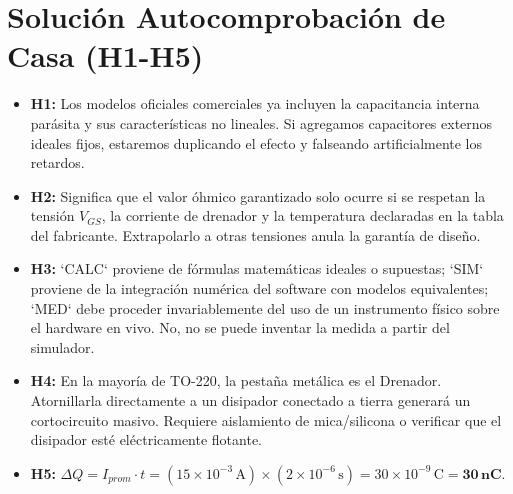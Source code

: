 \documentclass[11pt, a4paper]{article}
\begin{document}
\section*{Solución Autocomprobación de Casa (H1-H5)}
\begin{itemize}
    \setlength\itemsep{0.2em}
    \item \textbf{H1:} Los modelos oficiales comerciales ya incluyen la capacitancia interna parásita y sus características no lineales. Si agregamos capacitores externos ideales fijos, estaremos duplicando el efecto y falseando artificialmente los retardos.
    \item \textbf{H2:} Significa que el valor óhmico garantizado solo ocurre si se respetan la tensión $V_{GS}$, la corriente de drenador y la temperatura declaradas en la tabla del fabricante. Extrapolarlo a otras tensiones anula la garantía de diseño.
    \item \textbf{H3:} `CALC` proviene de fórmulas matemáticas ideales o supuestas; `SIM` proviene de la integración numérica del software con modelos equivalentes; `MED` debe proceder invariablemente del uso de un instrumento físico sobre el hardware en vivo. No, no se puede inventar la medida a partir del simulador.
    \item \textbf{H4:} En la mayoría de TO-220, la pestaña metálica es el Drenador. Atornillarla directamente a un disipador conectado a tierra generará un cortocircuito masivo. Requiere aislamiento de mica/silicona o verificar que el disipador esté eléctricamente flotante.
    \item \textbf{H5:} $\Delta Q = I_{prom} \cdot t = (15 \times 10^{-3}\,\text{A}) \times (2 \times 10^{-6}\,\text{s}) = 30 \times 10^{-9}\,\text{C} = \mathbf{30\,\text{nC}}$.
\end{itemize}
\end{document}
